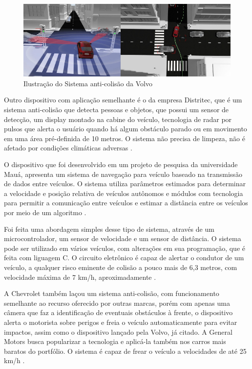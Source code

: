  \begin{figure}[h]
   \centering

   \includegraphics[width=450px, scale=1]{figuras/sistemavolvo}
   \caption{Ilustração do Sistema anti-colisão da Volvo}

\label{fig:sistemavolvo}
 \end{figure}


Outro dispositivo com aplicação semelhante é o da empresa Distritec, que é um sistema anti-colisão que detecta pessoas e objetos, que possui
um sensor de detecção, um display montado na cabine do veículo, tecnologia de radar por pulsos que alerta o usuário quando há algum obstáculo
 parado ou em movimento em uma área pré-definida de 10 metros. O sistema não precisa de limpeza, não é afetado por condições climáticas adversas
  \cite{distritec}.

O dispositivo que foi desenvolvido em um projeto de pesquisa da universidade Mauá, apresenta um sistema de navegação para veículo baseado na
transmissão de dados entre veículos. O sistema utiliza parâmetros estimados para determinar a velocidade e posição relativa de veículos autônomos
e módulos com tecnologia para permitir a comunicação entre veículos e estimar a distância entre os veículos por meio de um algoritmo \cite{sensoriamento}.

Foi feita uma abordagem simples desse tipo de sistema, através de um microcontrolador, um sensor de velocidade e um sensor de distância. O sistema
 pode ser utilizado em vários veículos, com alterações em sua programação, que é feita com liguagem C. O circuito eletrônico é capaz de alertar o
 condutor de um veículo, a qualquer risco eminente de colisão a pouco mais de 6,3 metros, com velocidade máxima de 7 km/h, aproximadamente \cite{iesam}.

A Chevrolet também laçou um sistema anti-colisão, com funcionamento semelhante ao recurso oferecido por outras marcas, porém com apenas uma câmera
 que faz a identificação de eventuais obstáculos à frente, o dispositivo alerta o motorista sobre perigos e freia o veículo automaticamente para
 evitar impactos, assim como o dispositivo lançado pela Volvo, já citado. A General Motors busca popularizar a tecnologia e aplicá-la também nos
 carros mais baratos do portfólio. O sistema é capaz de frear o veículo a velocidades de até 25 km/h \cite{chevrolet}.

